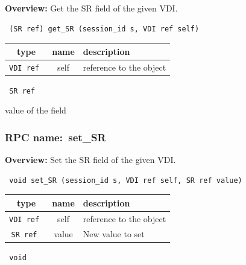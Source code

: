 {\bf Overview:} 
Get the SR field of the given VDI.

\begin{verbatim} (SR ref) get_SR (session_id s, VDI ref self)\end{verbatim}



 
\vspace{0.3cm}
\begin{tabular}{|c|c|p{7cm}|}
 \hline
{\bf type} & {\bf name} & {\bf description} \\ \hline
{\tt VDI ref } & self & reference to the object \\ \hline 

\end{tabular}

\vspace{0.3cm}

{\tt 
SR ref
}


value of the field
\vspace{0.3cm}
\vspace{0.3cm}
\vspace{0.3cm}
\subsubsection{RPC name:~set\_SR}

{\bf Overview:} 
Set the SR field of the given VDI.

\begin{verbatim} void set_SR (session_id s, VDI ref self, SR ref value)\end{verbatim}



 
\vspace{0.3cm}
\begin{tabular}{|c|c|p{7cm}|}
 \hline
{\bf type} & {\bf name} & {\bf description} \\ \hline
{\tt VDI ref } & self & reference to the object \\ \hline 

{\tt SR ref } & value & New value to set \\ \hline 

\end{tabular}

\vspace{0.3cm}

{\tt 
void
}



